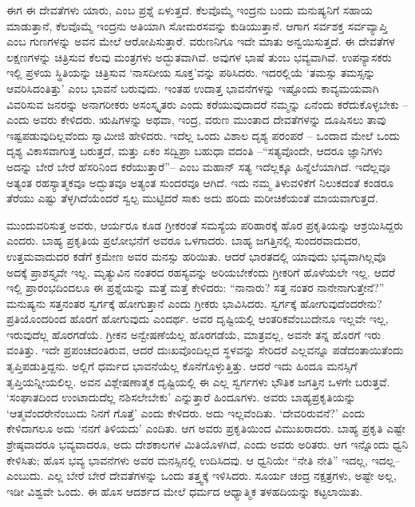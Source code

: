 ಈಗ ಈ ದೇವತೆಗಳು ಯಾರು, ಎಂಬ ಪ್ರಶ್ನೆ ಏಳುತ್ತದೆ. ಕೆಲವೊಮ್ಮೆ ಇಂದ್ರನು ಬಂದು ಮನುಷ್ಯನಿಗೆ ಸಹಾಯ ಮಾಡುತ್ತಾನೆ, ಕೆಲವೊಮ್ಮೆ ಇಂದ್ರನು ಅತಿಯಾಗಿ ಸೋಮರಸವನ್ನು ಕುಡಿಯುತ್ತಾನೆ. ಆಗಾಗ ಸರ್ವಶಕ್ತ ಸರ್ವವ್ಯಾಪ್ತಿ ಎಂಬ ಗುಣಗಳನ್ನು ಅವನ ಮೇಲೆ ಆರೋಪಿಸುತ್ತಾರೆ. ವರುಣನಿಗೂ ಇದೇ ಮಾತು ಅನ್ವಯಿಸುತ್ತದೆ. ಈ ದೇವತೆಗಳ ಲಕ್ಷಣಗಳನ್ನು ಚಿತ್ರಿಸುವ ಕೆಲವು ಮಂತ್ರಗಳು ಅದ್ಭುತವಾಗಿವೆ. ಅವುಗಳ ಭಾಷೆ ತುಂಬ ಭವ್ಯವಾಗಿವೆ. ಉಪನ್ಯಾಸಕರು ಇಲ್ಲಿ ಪ್ರಳಯ ಸ್ಥಿತಿಯನ್ನು ಚಿತ್ರಿಸುವ ‘ನಾಸದೀಯ ಸೂಕ್ತ’ವನ್ನು ಪಠಿಸಿದರು. ಇದರಲ್ಲಿಯೆ ‘ತಮಸ್ಸು ತಮಸ್ಸನ್ನು ಆವರಿಸಿದಂತಿತ್ತು’ ಎಂಬ ಭಾವನೆ ಬರುವುದು. ಇಂತಹ ಉದಾತ್ತ ಭಾವನೆಗಳನ್ನು ಇಷ್ಟೊಂದು ಕಾವ್ಯಮಯವಾಗಿ ವಿವರಿಸುವ ಜನರನ್ನು ಅನಾಗರೀಕರು ಅಸಂಸ್ಕೃತರು ಎಂದು ಕರೆಯುವುದಾದರೆ ನಮ್ಮನ್ನು ಏನೆಂದು ಕರೆದುಕೊಳ್ಳಬೇಕು – ಎಂದು ಅವರು ಕೇಳಿದರು. ಋಷಿಗಳನ್ನು ಅಥವಾ, ಇಂದ್ರ, ವರುಣ ಮುಂತಾದ ದೇವತೆಗಳನ್ನು ದೂಷಿಸಲು ತಾವು ಇಷ್ಟಪಡುವುದಿಲ್ಲವೆಂದು ಸ್ವಾಮೀಜಿ ಹೇಳಿದರು. ಇದೆಲ್ಲ ಒಂದು ವಿಶಾಲ ದೃಶ್ಯ ಪರಂಪರೆ – ಒಂದಾದ ಮೇಲೆ ಒಂದು ದೃಶ್ಯ ವಿಕಾಸವಾಗುತ್ತ ಬರುತ್ತದೆ, ಮತ್ತು ಏಕಂ ಸದ್ವಿಪ್ರಾ ಬಹುಧಾ ವದಂತಿ –“ಸತ್ಯವೊಂದೇ, ಆದರೂ ಜ್ಞಾನಿಗಳು ಅದನ್ನು ಬೇರೆ ಬೇರೆ ಹೆಸರಿನಿಂದ ಕರೆಯುತ್ತಾರೆ”– ಎಂಬ ಮಹಾನ್​ ಸತ್ಯ ಇದೆಲ್ಲಕ್ಕೂ ಹಿನ್ನೆಲೆಯಾಗಿದೆ. ಇದೆಲ್ಲವೂ ಅತ್ಯಂತ ರಹಸ್ಯಾತ್ಮಕವೂ ಅದ್ಭುತವೂ ಅತ್ಯಂತ ಸುಂದರವೂ ಆಗಿದೆ. ಇದು ನಮ್ಮ ತಿಳುವಳಿಕೆಗೆ ನಿಲುಕದಂತೆ ಕಂಡರೂ ತೆರೆಯು ಎಷ್ಟು ತೆಳ್ಳಗಿದೆಯೆಂದರೆ ಸ್ವಲ್ಪ ಮುಟ್ಟಿದರೆ ಸಾಕು ಅದು ಹರಿದು ಮರೀಚಿಕೆಯಂತೆ ಮಾಯವಾಗುತ್ತದೆ. 

ಮುಂದುವರಿಸುತ್ತ ಅವರು, ಆರ್ಯರೂ ಕೂಡ ಗ್ರೀಕರಂತೆ ಸಮಸ್ಯೆಯ ಪರಿಹಾರಕ್ಕೆ ಹೊರ ಪ್ರಕೃತಿಯನ್ನು ಆಶ್ರಯಿಸಿದ್ದರು ಎಂದರು. ಬಾಹ್ಯ ಪ್ರಕೃತಿಯ ಪ್ರಲೋಭನೆಗೆ ಅವರೂ ಒಳಗಾದರು. ಬಾಹ್ಯ ಜಗತ್ತಿನಲ್ಲಿ ಸುಂದರವಾದುದರ, ಉತ್ತಮವಾದುದರ ಕಡೆಗೆ ಕ್ರಮೇಣ ಅವರ ಮನಸ್ಸು ಹರಿಯಿತು. ಆದರೆ ಭಾರತದಲ್ಲಿ ಯಾವುದು ಭವ್ಯವಾಗಿಲ್ಲವೊ ಅದಕ್ಕೆ ಪ್ರಾಶಸ್ತ್ಯವೇ ಇಲ್ಲ. ಮೃತ್ಯುವಿನ ನಂತರದ ರಹಸ್ಯವನ್ನು ಅರಿಯಬೇಕೆಂದು ಗ್ರೀಕರಿಗೆ ಹೊಳೆಯಲೇ ಇಲ್ಲ. ಆದರೆ ಇಲ್ಲಿ ಪ್ರಾರಂಭದಿಂದಲೂ ಈ ಪ್ರಶ್ನೆಯನ್ನು ಮತ್ತೆ ಮತ್ತೆ ಕೇಳಿದರು: “ನಾನಾರು? ಸತ್ತ ನಂತರ ನಾನೇನಾಗುತ್ತೇನೆ?” ಮನುಷ್ಯನು ಸತ್ತನಂತರ ಸ್ವರ್ಗಕ್ಕೆ ಹೋಗುತ್ತಾನೆ ಎಂದು ಗ್ರೀಕರು ಭಾವಿಸಿದರು. ಸ್ವರ್ಗಕ್ಕೆ ಹೋಗುವುದೆಂದರೇನು? ಪ್ರತಿಯೊಂದರಿಂದ ಹೊರಗೆ ಹೋಗುವುದು ಎಂದರ್ಥ. ಅವರ ದೃಷ್ಟಿಯಲ್ಲಿ ಆಂತರಿಕವೆಂಬುದೇನೂ ಇಲ್ಲವೇ ಇಲ್ಲ, ಇರುವುದೆಲ್ಲ ಹೊರಗಡೆಯೆ. ಗ್ರೀಕನ ಅನ್ವೇಷಣೆಯೆಲ್ಲ ಹೊರಗಡೆಯೆ, ಮಾತ್ರವಲ್ಲ, ಅವನೇ ತನ್ನ ಹೊರಗೆ ಇರು ವಂತಿತ್ತು. ಇದೇ ಪ್ರಪಂಚದಂತಿರುವ, ಆದರೆ ದುಃಖವೊಂದಿಲ್ಲದ ಸ್ಥಳವನ್ನು ಸೇರಿದರೆ ಎಲ್ಲವನ್ನೂ ಪಡೆದಂತಾಯಿತೆಂದು ತೃಪ್ತಿಪಡುತ್ತಿದ್ದನು. ಅಲ್ಲಿಗೆ ಧರ್ಮದ ಭಾವನೆಯೆಲ್ಲ ಕೊನೆಗೊಳ್ಳುತ್ತಿತ್ತು. ಆದರೆ ಇದು ಹಿಂದೂ ಮನಸ್ಸಿಗೆ ತೃಪ್ತಿಯನ್ನೀಯಲಿಲ್ಲ. ಅವನ ವಿಶ್ಲೇಷಣಾತ್ಮಕ ದೃಷ್ಟಿಯಲ್ಲಿ ಈ ಎಲ್ಲ ಸ್ವರ್ಗಗಳು ಭೌತಿಕ ಜಗತ್ತಿನ ಒಳಗೇ ಬರುತ್ತವೆ. ‘ಸಂಘಾತದಿಂದ ಉಂಟಾದುದೆಲ್ಲ ನಶಿಸಲೇಬೇಕು’ ಎನ್ನುತ್ತಾರೆ ಹಿಂದೂಗಳು. ಅವರು ಬಾಹ್ಯಪ್ರಕೃತಿಯನ್ನು ‘ಆತ್ಮವೆಂದರೇನೆಂಬುದು ನಿನಗೆ ಗೊತ್ತೆ’ ಎಂದು ಕೇಳಿದರು. ಅದು ಇಲ್ಲವೆಂದಿತು. ‘ದೇವರಿರುವನೆ?’ ಎಂದು ಕೇಳಿದಾಗಲೂ ಅದು ‘ನನಗೆ ತಿಳಿಯದು’ ಎಂದಿತು. ಆಗ ಅವರು ಪ್ರಕೃತಿಯಿಂದ ವಿಮುಖರಾದರು. ಬಾಹ್ಯ ಪ್ರಕೃತಿ ಎಷ್ಟೇ ಶ್ರೇಷ್ಠವಾದರೂ ಭವ್ಯವಾದರೂ, ಅದು ದೇಶಕಾಲಗಳ ಮಿತಿಯೊಳಗಿದೆ, ಎಂದು ಅವರು ಅರಿತರು. ಆಗ ಇನ್ನೊಂದು ಧ್ವನಿ ಕೇಳಿಸಿತು; ಹೊಸ ಭವ್ಯ ಭಾವನೆಗಳು ಅವರ ಮನಸ್ಸಿನಲ್ಲಿ ಉದಿಸಿದವು. ಆ ಧ್ವನಿಯೇ “ನೇತಿ ನೇತಿ” ಇದಲ್ಲ, ಇದಲ್ಲ– ಎಂಬುದು. ಎಲ್ಲ ಬೇರೆ ಬೇರೆ ದೇವತೆಗಳನ್ನು ಒಂದು ತತ್ತ್ವಕ್ಕೆ ಇಳಿಸಿದರು. ಸೂರ್ಯ ಚಂದ್ರ ನಕ್ಷತ್ರಗಳು, ಅಷ್ಟೇ ಅಲ್ಲ, ಇಡೀ ವಿಶ್ವವೇ ಒಂದು. ಈ ಹೊಸ ಆದರ್ಶದ ಮೇಲೆ ಧರ್ಮದ ಆಧ್ಯಾತ್ಮಿಕ ತಳಹದಿಯನ್ನು ಕಟ್ಟಲಾಯಿತು.

